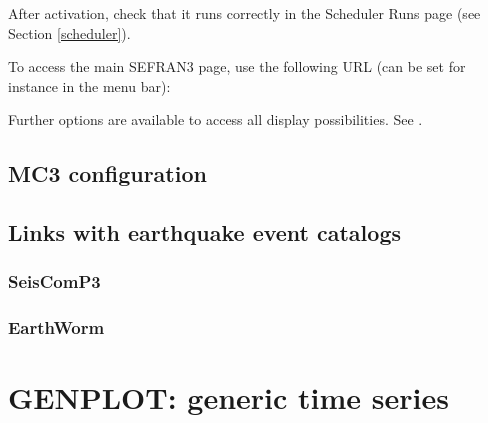 After activation, check that it runs correctly in the Scheduler Runs page (see Section \ref{scheduler}).

To access the main SEFRAN3 page, use the following URL (can be set for instance in the menu bar):


Further options are available to access all display possibilities. See .


\subsection{MC3 configuration}





%






\subsection{Links with earthquake event catalogs}

\subsubsection{SeisComP3}

\subsubsection{EarthWorm}



\section{GENPLOT: generic time series}
\label{genplot}

